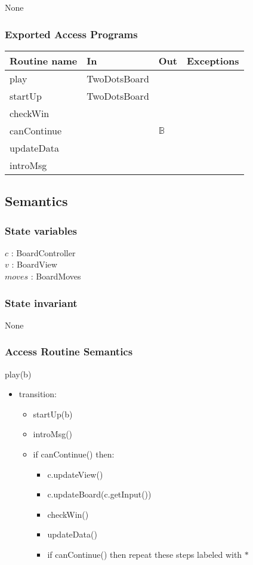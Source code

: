\documentclass[12pt]{article}
\begin{document}
None

\subsubsection* {Exported Access Programs}

\begin{tabular}{| l | l | l | p{6cm} |}
\hline
\textbf{Routine name} & \textbf{In} & \textbf{Out} & \textbf{Exceptions}\\
\hline
play & TwoDotsBoard & & \\
\hline
startUp & TwoDotsBoard & & \\
\hline
checkWin & & & \\
\hline
canContinue &  & $\mathbb{B}$ & \\
\hline
updateData &  & & \\
\hline
introMsg & & & \\
\hline
\end{tabular}

\subsection* {Semantics}


\subsubsection* {State variables}
\noindent $c$ : BoardController\\
\noindent $v$ : BoardView\\
\noindent $moves$ : BoardMoves\\


\subsubsection*{State invariant}
\noindent None

\subsubsection* {Access Routine Semantics}

\noindent play(b)
\begin{itemize}
\item transition: 
\begin{itemize}
\item startUp(b)
\item introMsg()
\item if canContinue() then:
\begin{itemize}
\item c.updateView()
\item c.updateBoard(c.getInput())
\item checkWin()
\item updateData()
\item if canContinue() then repeat these steps labeled with $*$
\end{itemize} 
\end{itemize}
\end{itemize}
\end{document}
